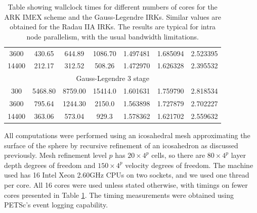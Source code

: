 \documentclass[a4paper, 12pt]{article}
\begin{document}
\begin{table}[h]
\begin{tabular}{ccccccc}
   3600   & 430.65   & 644.89   &1086.70  & 1.497481  & 1.685094  & 2.523395\\
  14400   & 212.17   & 312.52   & 508.26  & 1.472970  & 1.626328  & 2.395532\\
    \multicolumn{7}{c}{Gauss-Legendre 3 stage} \\
\hline
    300  &  5468.80  &  8759.00  &  15414.0  &  1.601631  &  1.759790  &  2.818534\\
   3600  &   795.64  &  1244.30   &  2150.0  &  1.563898  &  1.727879  &  2.702227\\
  14400   &  363.06   &  573.04    &  929.3   & 1.578362   & 1.621702  &  2.559632
  \end{tabular}
  \caption{Table showing wallclock times for different numbers of cores for the ARK IMEX scheme and the Gauss-Legendre IRKs. Similar values are obtained for the Radau IIA IRKs. The results are typical for intra node parallelism, with the usual bandwidth limitations.
    \label{tab:cores}}
\end{table}

All computations were performed using an icosahedral mesh
approximating the surface of the sphere by recursive refinement of an
icosahedron as discussed previously. Mesh refinement level $p$ has
$20\times 4^p$ cells, so there are $80\times 4^p$ layer depth degrees
of freedom and $150\times 4^p$ velocity degrees of freedom. The
machine used has 16 Intel Xeon 2.60GHz CPUs on two sockets, and we
used one thread per core. All 16 cores were used unless stated
otherwise, with timings on fewer cores presented in Table
\ref{tab:cores}.  The timing measurements were obtained using PETSc's
event logging capability.
\end{document}
